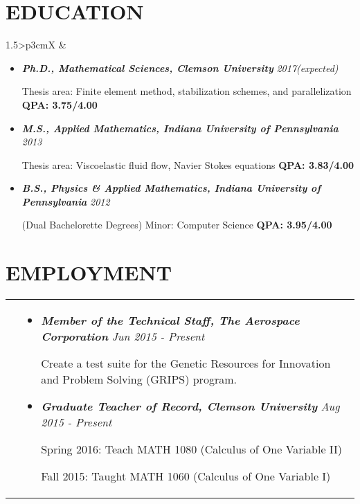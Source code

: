 \documentclass[10pt]{article}
\begin{document}
\section{\textbf{EDUCATION}}
\vspace*{-\baselineskip}
\hskip-1.7in
\begin{tabularx}{1.5\linewidth}{>{\raggedleft\scshape}p{3cm}X}
  &\begin{itemize}
    \setlength\itemsep{.005em}
  \item \textbf{\textit{Ph.D., Mathematical Sciences, Clemson University}}  \hspace{44 mm} \textit{2017(expected)}
  
             Thesis area: Finite element method, stabilization schemes, and parallelization \textbf{QPA: 3.75/4.00}
             
\item \textbf{\textit{M.S., Applied Mathematics, Indiana University of Pennsylvania}} \hspace{20.5 mm} \textit{2013}
  
             Thesis area: Viscoelastic fluid flow, Navier Stokes equations \textbf{QPA: 3.83/4.00}
             
\item \textbf{\textit{B.S., Physics \& Applied Mathematics, Indiana University of Pennsylvania}} \hspace{3 mm}\textit{2012}
  
             (Dual Bachelorette Degrees) Minor: Computer Science \textbf{QPA: 3.95/4.00}
             
  \end{itemize} 

\end{tabularx}

\section{\textbf{EMPLOYMENT}}
\vspace*{-\baselineskip}
\hskip-1.7in
\begin{tabularx}{1.5\linewidth}{>{\raggedleft\scshape}p{3cm}X}

  &\begin{itemize}
    \setlength\itemsep{.005em}
  \item \textbf{\textit{Member of the Technical Staff, The Aerospace Corporation}}    \hspace{17 mm}\textit{Jun 2015 - Present}
  
Create a test suite for the Genetic Resources for Innovation and Problem Solving (GRIPS) program. 
               
                   \setlength\itemsep{.005em}
  \item \textbf{\textit{Graduate Teacher of Record, 
  Clemson University}}    \hspace{34 mm}\textit{Aug 2015 - Present}
  
Spring 2016: Teach MATH 1080 (Calculus of One Variable II)

Fall 2015: Taught MATH 1060 (Calculus of One Variable I)
  \end{itemize} 

\end{tabularx}
\end{document}
